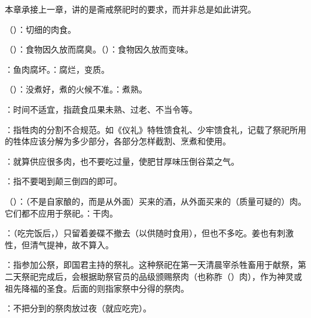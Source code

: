 {
本章承接上一章，讲的是斋戒祭祀时的要求，而并非总是如此讲究。
\begin{lyblobitemize}
\item {}（）：切细的肉食。
\item {}（）：食物因久放而腐臭。（）：食物因久放而变味。

：鱼肉腐坏。：腐烂，变质。
\item {}（）：没煮好，煮的火候不准。：煮熟。

：时间不适宜，指蔬食瓜果未熟、过老、不当令等。

：指牲肉的分割不合规范。如《仪礼》特牲馈食礼、少牢馈食礼，记载了祭祀所用的牲体应该分解为多少部分，各部分怎样截割、烹煮和使用。
\item {}：就算供应很多肉，也不要吃过量，使肥甘厚味压倒谷菜之气。
\item {}：指不要喝到颠三倒四的即可。
\item {}（）：（不是自家酿的，而是从外面）买来的酒，从外面买来的（质量可疑的）肉。它们都不应用于祭祀。：干肉。
\item {}：（吃完饭后，）只留着姜碟不撤去（以供随时食用），但也不多吃。姜也有刺激性，但清气提神，故不算入。
\end{lyblobitemize}
}
{}


{
\item {}：指参加公祭，即国君主持的祭礼。这种祭祀在第一天清晨宰杀牲畜用于献祭，第二天祭祀完成后，会根据助祭官员的品级颁赐祭肉（也称胙（）肉），作为神灵或祖先降福的圣食。后面的则指家祭中分得的祭肉。
\item {}：不把分到的祭肉放过夜（就应吃完）。
}
{}


